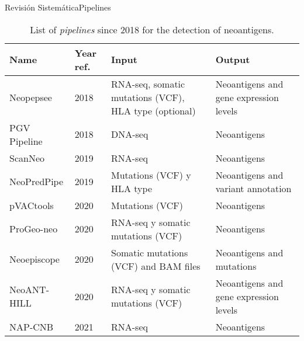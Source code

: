 \documentclass[10pt]{beamer}
\newcommand{\1}{
	\setbeamertemplate{background}{
		\texttt{[image: img/1]}
		\tikz[overlay] \fill[fill opacity=0.75,fill=white] (0,0) rectangle (-\paperwidth,\paperheight);
	}
}
\begin{document}
\begin{frame}{Revisión Sistemática}{Pipelines}
	
	\fontsize{7pt}{5pt}\selectfont
	
	\begin{table}[]
		\centering
		\caption{List of \textit{pipelines} since 2018 for the detection of neoantigens.}		
		\setlength{\tabcolsep}{0.5em} %
		{\renewcommand{\arraystretch}{2}%
			\begin{tabular}{lp{1.2cm}p{2.5cm}p{2.5cm}}
				\textbf{Name} & \textbf{Year ref.}                                  & \textbf{Input}                                         & \textbf{Output}                                     \\ \hline
				Neopepsee       & 2018 \cite{kim2018neopepsee}           & RNA-seq, somatic mutations (VCF), HLA type (optional) & Neoantigens and gene expression levels   \\ 
				PGV Pipeline    & 2018 \cite{rubinsteyn2018computational}& DNA-seq                                                  & Neoantigens                                       \\
				ScanNeo         & 2019 \cite{wang2019scanneo}            & RNA-seq                                                  & Neoantigens                                       \\
				NeoPredPipe     & 2019 \cite{schenck2019neopredpipe}     & Mutations (VCF) y HLA type                           & Neoantigens and variant annotation              \\
				pVACtools       & 2020 \cite{hundal2020pvactools}        & Mutations (VCF)                                         & Neoantigens                                       \\
				ProGeo-neo      & 2020 \cite{li2020progeo}               & RNA-seq y somatic mutations (VCF)                        & Neoantigens                                       \\
				Neoepiscope     & 2020 \cite{wood2020neoepiscope}        & Somatic mutations (VCF) and BAM files                  & Neoantigens and mutations                          \\
				NeoANT-HILL     & 2020 \cite{coelho2020neoant}           & RNA-seq y somatic mutations (VCF)                        & Neoantigens and gene expression levels \\
				NAP-CNB         & 2021 \cite{wert2021predicting}         & RNA-seq                                                  & Neoantigens                                       \\
				

\end{tabular}}
\end{table}
\end{frame}
\end{document}
